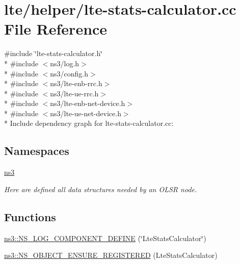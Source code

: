 \hypertarget{lte-stats-calculator_8cc}{}\section{lte/helper/lte-\/stats-\/calculator.cc File Reference}
\label{lte-stats-calculator_8cc}
{\ttfamily \#include \char`\"{}lte-\/stats-\/calculator.\+h\char`\"{}}\\*
{\ttfamily \#include $<$ns3/log.\+h$>$}\\*
{\ttfamily \#include $<$ns3/config.\+h$>$}\\*
{\ttfamily \#include $<$ns3/lte-\/enb-\/rrc.\+h$>$}\\*
{\ttfamily \#include $<$ns3/lte-\/ue-\/rrc.\+h$>$}\\*
{\ttfamily \#include $<$ns3/lte-\/enb-\/net-\/device.\+h$>$}\\*
{\ttfamily \#include $<$ns3/lte-\/ue-\/net-\/device.\+h$>$}\\*
Include dependency graph for lte-\/stats-\/calculator.cc\+:
\subsection*{Namespaces}
\begin{DoxyCompactItemize}
\item 
 \hyperlink{namespacens3}{ns3}
\begin{DoxyCompactList}\small\item\em Here are defined all data structures needed by an O\+L\+SR node. \end{DoxyCompactList}\end{DoxyCompactItemize}
\subsection*{Functions}
\begin{DoxyCompactItemize}
\item 
\hyperlink{namespacens3_a12859586ccde542470171407c15d3764}{ns3\+::\+N\+S\+\_\+\+L\+O\+G\+\_\+\+C\+O\+M\+P\+O\+N\+E\+N\+T\+\_\+\+D\+E\+F\+I\+NE} (\char`\"{}Lte\+Stats\+Calculator\char`\"{})
\item 
\hyperlink{namespacens3_ab4b97d4d922072d2242e479a7099b3a0}{ns3\+::\+N\+S\+\_\+\+O\+B\+J\+E\+C\+T\+\_\+\+E\+N\+S\+U\+R\+E\+\_\+\+R\+E\+G\+I\+S\+T\+E\+R\+ED} (Lte\+Stats\+Calculator)
\end{DoxyCompactItemize}
